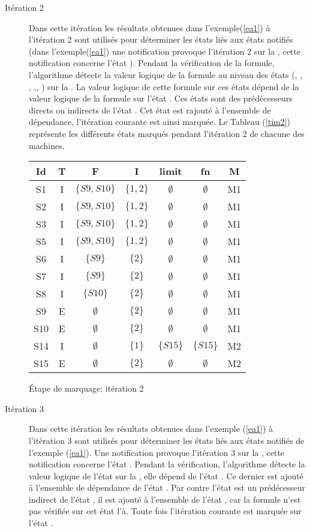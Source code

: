 \begin{Exemple}
\begin{description}
	\item[Itération 2] Dans cette itération les résultats obtenues dans l'exemple(\ref{ea1}) à l'itération 2 sont utilisés pour déterminer les états liés aux états notifiés (dans l'exemple(\ref{ea1}) une notification provoque l'itération 2 sur la \mone{}, cette notification concerne l'état ). Pendant la vérification de la formule, l'algorithme détecte la valeur logique de la formule au niveau des états (, , , ,, ) sur la \mone{}. La valeur logique de cette formule sur ces états dépend de la valeur logique de la formule  sur l'état . Ces états sont des prédécesseurs directs ou indirects de l'état  . Cet état est rajouté à l'ensemble  de dépendance, l'itération courante est ainsi marquée. 
Le Tableau (\ref{tim2}) représente les différents états marqués pendant l'itération 2 de chacune des machines.  
	\begin{tableth}
	\centering
	\begin{tabular}{|*{7}{c|}}
		\hline
		Id&		T&			F&	I&	limit&	fn&		M\\
		\hline
		S1&	I&	$\{S9,S10\}$&	$\{1,2\}$&	$\emptyset$& $\emptyset$&		M1\\ \hline
		S2&	I&	$\{S9,S10\}$&	$\{1,2\}$&	$\emptyset$& $\emptyset$&		M1\\ \hline
		S3&	I&	$\{S9,S10\}$&	$\{1,2\}$&	$\emptyset$& $\emptyset$&		M1\\ \hline
		S5&	I&	$\{S9,S10\}$&	$\{1,2\}$&	$\emptyset$& $\emptyset$&		M1\\ \hline
		S6&	I&	$\{S9\}$	   &	$\{2\}$&	$\emptyset$& $\emptyset$&		M1\\ \hline
		S7&	I&	$\{S9\}$    &	$\{2\}$&	$\emptyset$& $\emptyset$&		M1\\ \hline
		S8&	I&	$\{S10\}$   &	$\{2\}$&	$\emptyset$& $\emptyset$&		M1\\ \hline
		S9&	E&	$\emptyset$&	$\{2\}$&	$\emptyset$& $\emptyset$&		M1\\ \hline
		S10&E&	$\emptyset$&	$\{2\}$&	$\emptyset$& $\emptyset$&		M1\\ \hline
		S14&I&	$\emptyset$&	$\{1\}$&	$\{S15\}$   & $\{S15\}$&			M2\\ \hline
		S15&E&	$\emptyset$&	$\{2\}$&	$\emptyset$& $\emptyset$&		M2\\				
		\hline
	\end{tabular}
	\caption{Étape de marquage: itération 2}\label{tim2}
\end{tableth}
	\item[Itération 3] Dans cette itération les résultats obtenues dans l'exemple (\ref{ea1}) à l'itération 3 sont utilisés pour déterminer les états liés aux états notifiés de l'exemple (\ref{ea1}). Une notification provoque l'itération 3 sur la \mtree{}, cette notification concerne l'état . Pendant la vérification, l'algorithme détecte la valeur logique de l'état  sur la \mtree{}, elle dépend de l'état . Ce dernier est ajouté à l'ensemble  de dépendance de l'état . Par contre l'état  est un prédécesseur indirect de l'état , il est ajouté à l'ensemble  de l'état  , car la formule n'est pas vérifiée sur cet état l'à. Toute fois l'itération courante est marquée sur l'état . 

\end{description}
\end{Exemple}
